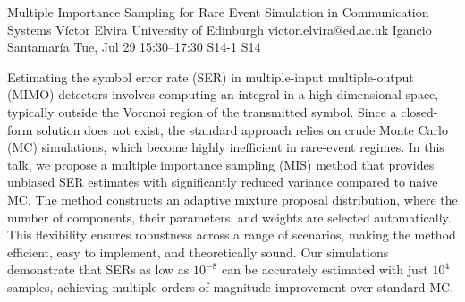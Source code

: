 \begin{talk}
  {Multiple Importance Sampling for Rare Event Simulation in Communication Systems}%
  {V\'ictor Elvira}%
  {University of Edinburgh}%
  {victor.elvira@ed.ac.uk}%
  {Igancio Santamar\'ia}%
  {}%
  {Tue, Jul 29 15:30–17:30}%
  {S14-1}%
  {S14}%
  
				
			
Estimating the symbol error rate (SER) in multiple-input multiple-output (MIMO) detectors involves computing an integral in a high-dimensional space, typically outside the Voronoi region of the transmitted symbol. Since a closed-form solution does not exist, the standard approach relies on crude Monte Carlo (MC) simulations, which become highly inefficient in rare-event regimes.  In this talk, we propose a multiple importance sampling (MIS) method that provides unbiased SER estimates with significantly reduced variance compared to naive MC. The method constructs an adaptive mixture proposal distribution, where the number of components, their parameters, and weights are selected automatically. This flexibility ensures robustness across a range of scenarios, making the method efficient, easy to implement, and theoretically sound. Our simulations demonstrate that SERs as low as $10^{-8}$ can be accurately estimated with just $10^4$ samples, achieving multiple orders of magnitude improvement over standard MC.
\medskip


\end{talk}

